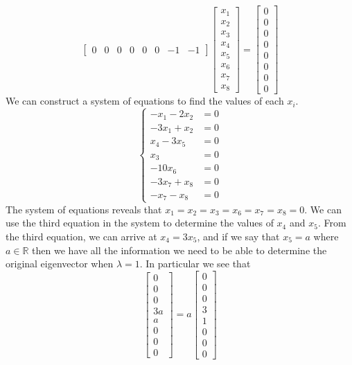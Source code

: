 \documentclass{report}
\begin{document}
\begin{itemize}
$$\begin{bmatrix}
0&0&0&0&0&0&-1&-1
\end{bmatrix}
\begin{bmatrix}
x_1 \\ x_2 \\ x_3 \\ x_4 \\ x_5 \\ x_6 \\ x_7 \\ x_8
\end{bmatrix} = \begin{bmatrix}
0 \\ 0 \\ 0 \\ 0 \\ 0 \\ 0 \\ 0 \\ 0
\end{bmatrix}
$$
We can construct a system of equations to find the values of each $x_i$.
$$
\left\{
\begin{aligned}
-x_1 - 2x_2 & = 0 \\
-3x_1 + x_2 & = 0 \\
x_4-3x_5 & = 0 \\
x_3 & = 0 \\
-10x_6 & = 0 \\
-3x_7 + x_8 & = 0 \\
-x_7 - x_8 & = 0
\end{aligned}
\right.
$$
The system of equations reveals that $x_1 = x_2 = x_3 = x_6 = x_7 = x_8 = 0$.  We can use the third equation in the system to determine the values of $x_4$ and $x_5$.  From the third equation,  we can arrive at $x_4 = 3x_5$,  and if we say that $x_5 = a$ where $a\in\mathbb{R}$ then we have all the information we need to be able to determine the original eigenvector when $\lambda = 1$.  In particular we see that
$$
\begin{bmatrix}
0 \\ 0 \\ 0 \\ 3a \\ a \\ 0 \\ 0 \\ 0
\end{bmatrix} =
a\begin{bmatrix}
0 \\ 0 \\ 0 \\ 3 \\ 1 \\ 0 \\ 0 \\ 0

\end{bmatrix}$$
\end{itemize}
\end{document}
